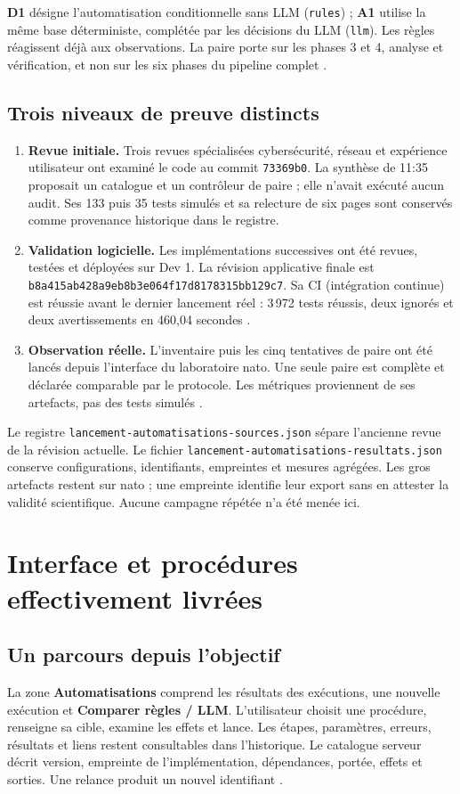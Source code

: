 \documentclass[11pt,a4paper]{article}
\newcommand{\code}[1]{\nolinkurl{#1}}
\begin{document}
\textbf{D1} désigne l'automatisation conditionnelle sans LLM (\code{rules}) ;
\textbf{A1} utilise la même base déterministe, complétée par les décisions du
LLM (\code{llm}). Les règles réagissent déjà aux observations. La paire porte
sur les phases 3 et 4, analyse et vérification, et non sur les six phases du
pipeline complet \cite{protocole,cli}.

\subsection{Trois niveaux de preuve distincts}
\begin{enumerate}
\item \textbf{Revue initiale.} Trois revues spécialisées cybersécurité, réseau
et expérience utilisateur ont examiné le code au commit \code{73369b0}.
La synthèse de 11:35 proposait un catalogue et un contrôleur de paire ; elle
n'avait exécuté aucun audit. Ses 133 puis 35 tests simulés et sa relecture de
six pages sont conservés comme provenance historique dans le registre.
\item \textbf{Validation logicielle.} Les implémentations successives ont été
revues, testées et déployées sur Dev 1. La révision applicative finale est
\code{b8a415ab428a9eb8b3e064f17d8178315bb129c7}. Sa CI (intégration continue)
est réussie avant le dernier lancement réel : 3\,972 tests réussis, deux
ignorés et deux avertissements en 460,04 secondes \cite{ci}.
\item \textbf{Observation réelle.} L'inventaire puis les cinq tentatives de
paire ont été lancés depuis l'interface du laboratoire nato. Une seule paire
est complète et déclarée comparable par le protocole. Les métriques proviennent
de ses artefacts, pas des tests simulés \cite{resultats}.
\end{enumerate}

Le registre \code{lancement-automatisations-sources.json} sépare l'ancienne
revue de la révision actuelle. Le fichier \code{lancement-automatisations-resultats.json}
conserve configurations, identifiants, empreintes et mesures agrégées. Les gros
artefacts restent sur nato ; une empreinte identifie leur export sans en
attester la validité scientifique. Aucune campagne répétée n'a été menée ici.

\clearpage
\section{Interface et procédures effectivement livrées}
\subsection{Un parcours depuis l'objectif}
La zone \textbf{Automatisations} comprend les résultats des exécutions, une
nouvelle exécution et \textbf{Comparer règles / LLM}. L'utilisateur choisit
une procédure, renseigne sa cible, examine les effets et lance. Les étapes,
paramètres, erreurs, résultats et liens restent consultables dans l'historique.
Le catalogue serveur décrit version, empreinte de l'implémentation, dépendances,
portée, effets et sorties. Une relance produit un nouvel identifiant \cite{catalogue}.
\end{document}
